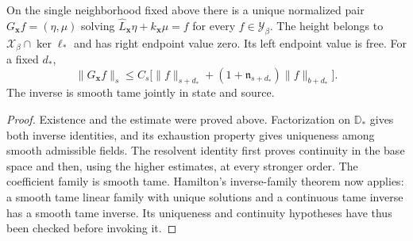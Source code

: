 \begin{proposition}
\label{prop:rewrite-volume-inverse}
On the single neighborhood fixed above there is a unique normalized
pair $G_{\mathbf x}f=(\eta,\mu)$ solving
$\widehat L_{\mathbf x}\eta+k_{\mathbf x}\mu=f$ for every
$f\in\mathcal Y_\beta$. The height belongs to
$\mathcal X_\beta\cap\ker\ell_*$ and has right endpoint value zero.
Its left endpoint value is free. For a fixed $d_*$,
\begin{equation}\label{eq:readable-physical-inverse-tame}
 \|G_{\mathbf x}f\|_s
 \le C_s\bigl[\|f\|_{s+d_*}
       +(1+\mathfrak n_{s+d_*})\|f\|_{b+d_*}\bigr].
\end{equation}
The inverse is smooth tame jointly in state and source.
\end{proposition}

\begin{proof}
Existence and the estimate were proved above. Factorization on
$\mathbb D_*$ gives both inverse identities, and its exhaustion
property gives uniqueness among smooth admissible fields. The
resolvent identity first proves continuity in the base space and
then, using the higher estimates, at every stronger order. The
coefficient family is smooth tame. Hamilton's inverse-family theorem
\cite[II, Theorem~3.1.1, p.~150]{Hamilton1982} now applies: a smooth
tame linear family with unique solutions and a continuous tame inverse
has a smooth tame inverse. Its uniqueness and continuity hypotheses
have thus been checked before invoking it.
\end{proof}
